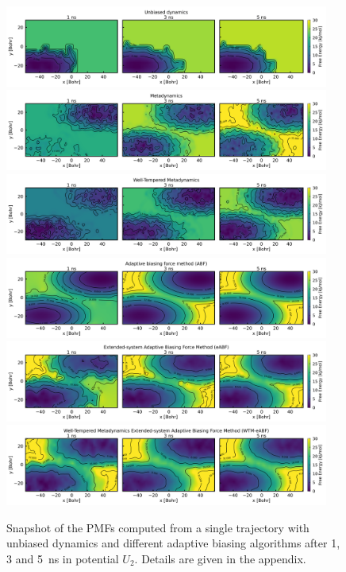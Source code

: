 \begin{figure}[H]
  \centering
  \includegraphics[width=0.95\textwidth]{bilder/test_2D/reference_freeE} \\
  \includegraphics[width=0.95\textwidth]{bilder/test_2D/metaD_freeE} \\
  \includegraphics[width=0.95\textwidth]{bilder/test_2D/WTM_freeE} \\
  \includegraphics[width=0.95\textwidth]{bilder/test_2D/ABF_freeE}  \\
  \includegraphics[width=0.95\textwidth]{bilder/test_2D/eABF_freeE} \\
  \includegraphics[width=0.95\textwidth]{bilder/test_2D/meta_eABF_freeE}
  \caption{
  Snapshot of the PMFs computed from a single trajectory with unbiased dynamics and different adaptive biasing algorithms after 1, 3 and 5~ns in potential $U_2$. Details are given in the appendix.}
\label{fig:2D ABF}%
\end{figure}
